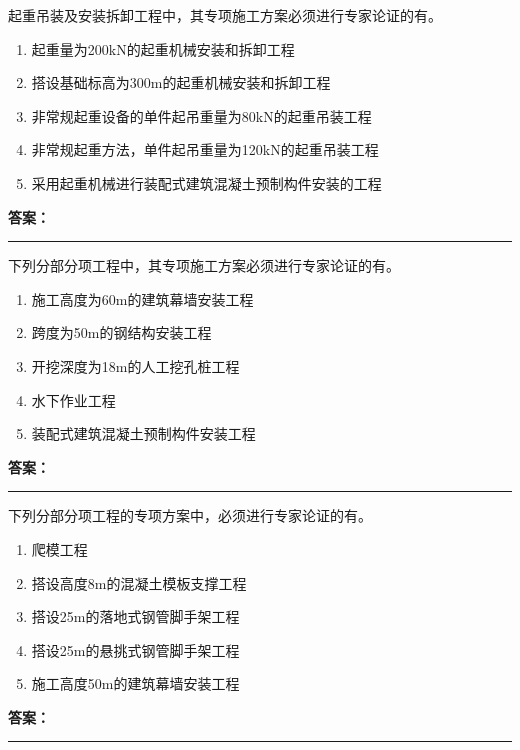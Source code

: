 \documentclass[UTF8,fontset=fandol,11pt]{ctexart}
\newcommand{\answerline}{\textcolor{answerred}{\rule{2.4cm}{0.7pt}}}
\begin{document}
\begin{quizbox}[title={第 6 题}]
起重吊装及安装拆卸工程中，其专项施工方案必须进行专家论证的有。\\
\begin{enumerate}[label=\Alph*.]
\item 起重量为200kN的起重机械安装和拆卸工程
\item 搭设基础标高为300m的起重机械安装和拆卸工程
\item 非常规起重设备的单件起吊重量为80kN的起重吊装工程
\item 非常规起重方法，单件起吊重量为120kN的起重吊装工程
\item 采用起重机械进行装配式建筑混凝土预制构件安装的工程
\end{enumerate}
\textbf{\textcolor{answerred}{答案：}} \answerline
\end{quizbox}

\vspace{0.2em}

\begin{quizbox}[title={第 7 题}]
下列分部分项工程中，其专项施工方案必须进行专家论证的有。\\
\begin{enumerate}[label=\Alph*.]
\item 施工高度为60m的建筑幕墙安装工程
\item 跨度为50m的钢结构安装工程
\item 开挖深度为18m的人工挖孔桩工程
\item 水下作业工程
\item 装配式建筑混凝土预制构件安装工程
\end{enumerate}
\textbf{\textcolor{answerred}{答案：}} \answerline
\end{quizbox}

\vspace{0.2em}

\begin{quizbox}[title={第 8 题}]
下列分部分项工程的专项方案中，必须进行专家论证的有。\\
\begin{enumerate}[label=\Alph*.]
\item 爬模工程
\item 搭设高度8m的混凝土模板支撑工程
\item 搭设25m的落地式钢管脚手架工程
\item 搭设25m的悬挑式钢管脚手架工程
\item 施工高度50m的建筑幕墙安装工程
\end{enumerate}
\textbf{\textcolor{answerred}{答案：}} \answerline
\end{quizbox}
\end{document}
